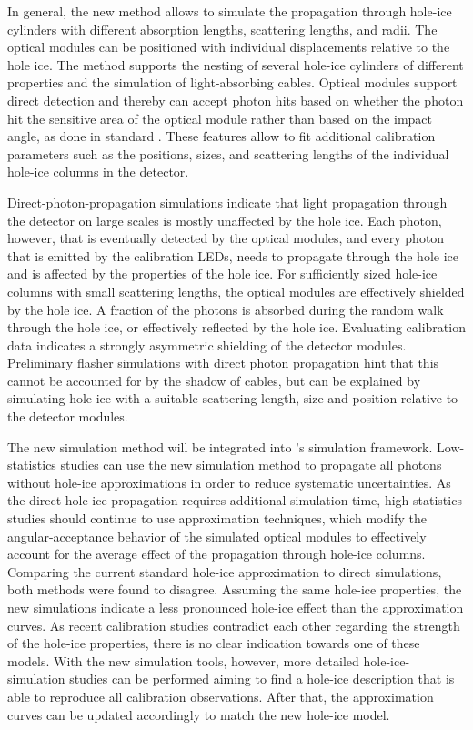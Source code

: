 In general, the new method allows to simulate the propagation through hole-ice cylinders with different absorption lengths, scattering lengths, and radii.
The optical modules can be positioned with individual displacements relative to the hole ice.
The method supports the nesting of several hole-ice cylinders of different properties and the simulation of light-absorbing cables.
Optical modules support direct detection and thereby can accept photon hits based on whether the photon hit the sensitive area of the optical module rather than based on the impact angle, as done in standard \clsim.
These features allow to fit additional calibration parameters such as the positions, sizes, and scattering lengths of the individual hole-ice columns in the \icecube detector.

Direct-photon-propagation simulations indicate that light propagation through the \icecube detector on large scales is mostly unaffected by the hole ice. Each photon, however, that is eventually detected by the optical modules, and every photon that is emitted by the calibration LEDs, needs to propagate through the hole ice and is affected by the properties of the hole ice.
For sufficiently sized hole-ice columns with small scattering lengths, the optical modules are effectively shielded by the hole ice. A fraction of the photons is absorbed during the random walk through the hole ice, or effectively reflected by the hole ice.
Evaluating calibration data indicates a strongly asymmetric shielding of the detector modules. Preliminary flasher simulations with direct photon propagation hint that this cannot be accounted for by the shadow of cables, but can be explained by simulating hole ice with a suitable scattering length, size and position relative to the detector modules.

The new simulation method will be integrated into \icecube's simulation framework.
Low-statistics studies can use the new simulation method to propagate all photons without hole-ice approximations in order to reduce systematic uncertainties.
As the direct hole-ice propagation requires additional simulation time, high-statistics studies should continue to use approximation techniques, which modify the angular-acceptance behavior of the simulated optical modules to effectively account for the average effect of the propagation through hole-ice columns.
Comparing the current standard hole-ice approximation to direct simulations, both methods were found to disagree.
Assuming the same hole-ice properties, the new simulations indicate a less pronounced hole-ice effect than the approximation curves.
As recent calibration studies contradict each other regarding the strength of the hole-ice properties, there is no clear indication towards one of these models.
With the new simulation tools, however, more detailed hole-ice-simulation studies can be performed aiming to find a hole-ice description that is able to reproduce all calibration observations.
After that, the approximation curves can be updated accordingly to match the new hole-ice model.

